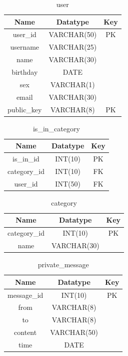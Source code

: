 \begin{table}[!ht]
\caption{user}
\centering
\begin{tabular}{c c c}
\hline\hline
Name               & Datatype    & Key \\
\hline
user\_id           & VARCHAR(50)  & PK \\  %
username           & VARCHAR(25)  &    \\
name               & VARCHAR(30)  &    \\
birthday           & DATE         &    \\
sex                & VARCHAR(1)   &    \\
email              & VARCHAR(30)  &    \\
public\_key        & VARCHAR(8)   & PK \\
\hline
\end{tabular}
\label{table:nonlin}
\end{table}

\begin{table}[!ht]
\caption{is\_in\_category}
\centering
\begin{tabular}{c c c}
\hline\hline
Name               & Datatype    & Key \\
\hline
is\_in\_id         & INT(10)     & PK   \\
category\_id       & INT(10)     & FK   \\
user\_id           & INT(50)     & FK   \\
\hline
\end{tabular}
\label{table:nonlin}
\end{table}

\begin{table}[!ht]
\caption{category}
\centering
\begin{tabular}{c c c}
\hline\hline
Name               & Datatype    & Key \\
\hline
category\_id       & INT(10)     & PK  \\
name               & VARCHAR(30) &     \\
\hline
\end{tabular}
\label{table:nonlin}
\end{table}


\begin{table}[!ht]
\caption{private\_message}
\centering
\begin{tabular}{c c c}
\hline\hline
Name               & Datatype    & Key \\
\hline
message\_id        & INT(10)     & PK  \\
from               & VARCHAR(8)  &     \\
to                 & VARCHAR(8)  &     \\
content            & VARCHAR(50) &     \\
time               & DATE        &     \\
\hline
\end{tabular}
\label{table:nonlin}
\end{table}

